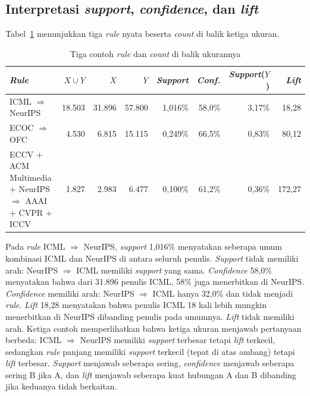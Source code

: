\subsection{Interpretasi \textit{support}, \textit{confidence}, dan \textit{lift}}
\label{sec:hasil-t5-metrik}
Tabel~\ref{tab:t5-contoh} menunjukkan tiga \textit{rule} nyata beserta \textit{count} di balik ketiga ukuran.

\begin{table}[ht]
\caption{Tiga contoh \textit{rule} dan \textit{count} di balik ukurannya}
\label{tab:t5-contoh}
\footnotesize
\begin{tabularx}{\textwidth}{@{}>{\raggedright\arraybackslash}Xrrrrrrr@{}}
\toprule
\textbf{\textit{Rule}} & \textbf{$X \cup Y$} & \textbf{$X$} & \textbf{$Y$} & \textbf{\textit{Support}} & \textbf{\textit{Conf.}} & \textbf{\textit{Support}($Y$)} & \textbf{\textit{Lift}} \\
\midrule
ICML $\Rightarrow$ NeurIPS & 18.503 & 31.896 & 57.800 & 1,016\% & 58,0\% & 3,17\% & 18,28 \\
ECOC $\Rightarrow$ OFC & 4.530 & 6.815 & 15.115 & 0,249\% & 66,5\% & 0,83\% & 80,12 \\
ECCV + ACM Multimedia + NeurIPS $\Rightarrow$ AAAI + CVPR + ICCV & 1.827 & 2.983 & 6.477 & 0,100\% & 61,2\% & 0,36\% & 172,27 \\
\bottomrule
\end{tabularx}
\end{table}

Pada \textit{rule} ICML $\Rightarrow$ NeurIPS, \textit{support} 1,016\% menyatakan seberapa umum kombinasi ICML dan NeurIPS di antara seluruh penulis. \textit{Support} tidak memiliki arah: NeurIPS $\Rightarrow$ ICML memiliki \textit{support} yang sama. \textit{Confidence} 58,0\% menyatakan bahwa dari 31.896 penulis ICML, 58\% juga menerbitkan di NeurIPS. \textit{Confidence} memiliki arah: NeurIPS $\Rightarrow$ ICML hanya 32,0\% dan tidak menjadi \textit{rule}. \textit{Lift} 18,28 menyatakan bahwa penulis ICML 18 kali lebih mungkin menerbitkan di NeurIPS dibanding penulis pada umumnya. \textit{Lift} tidak memiliki arah. Ketiga contoh memperlihatkan bahwa ketiga ukuran menjawab pertanyaan berbeda: ICML $\Rightarrow$ NeurIPS memiliki \textit{support} terbesar tetapi \textit{lift} terkecil, sedangkan \textit{rule} panjang memiliki \textit{support} terkecil (tepat di atas ambang) tetapi \textit{lift} terbesar. \textit{Support} menjawab seberapa sering, \textit{confidence} menjawab seberapa sering B jika A, dan \textit{lift} menjawab seberapa kuat hubungan A dan B dibanding jika keduanya tidak berkaitan.

